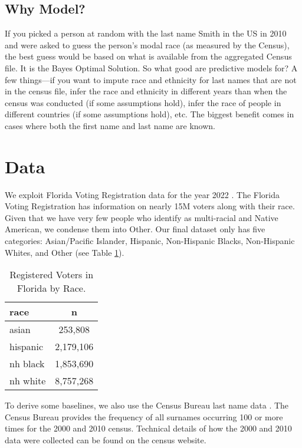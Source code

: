 \documentclass[12pt, letterpaper]{article}
\begin{document}
\subsection*{Why Model?} If you picked a person at random with the last name Smith in the US in 2010 and were asked to guess the person's modal race (as measured by the Census), the best guess would be based on what is available from the aggregated Census file. It is the Bayes Optimal Solution. So what good are predictive models for? A few things---if you want to impute race and ethnicity for last names that are not in the census file, infer the race and ethnicity in different years than when the census was conducted (if some assumptions hold), infer the race of people in different countries (if some assumptions hold), etc. The biggest benefit comes in cases where both the first name and last name are known.

\section*{Data}
We exploit Florida Voting Registration data for the year 2022 \citep{sood_2017}. The Florida Voting Registration has information on nearly 15M voters along with their race. Given that we have very few people who identify as multi-racial and Native American, we condense them into Other. Our final dataset only has five categories: Asian/Pacific Islander, Hispanic, Non-Hispanic Blacks, Non-Hispanic Whites, and Other (see Table \ref{table:fl_data}). 

\begin{table}[h!]
\centering
\caption{Registered Voters in Florida by Race.}
\begin{tabular}{ l c }
\hline    
race & n \\
\hline
asian & 253,808 \\
hispanic & 2,179,106 \\
nh black & 1,853,690 \\
nh white & 8,757,268 \\
\hline
\end{tabular}
\label{table:fl_data}
\end{table}

To derive some baselines, we also use the Census Bureau last name data \citep{census2010}. The Census Bureau provides the frequency of all surnames occurring 100 or more times for the 2000 and 2010 census. Technical details of how the 2000 and 2010 data were collected can be found on the census website. 
\end{document}
